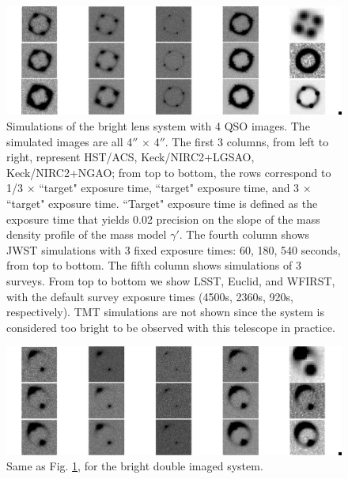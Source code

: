 \documentclass[a4paper,11pt]{article}
\begin{document}
\begin{figure}
\begin{center}
\includegraphics[width=1.0\textwidth]{figures/brighter_system_4QSOimages_all.png}
\end{center}
\caption{Simulations of the bright lens system with 4 QSO images. The simulated images are all 4$''$ $\times$ 4$''$. The first 3 columns, from left to right, represent HST/ACS, Keck/NIRC2+LGSAO, Keck/NIRC2+NGAO; from top to bottom, the rows correspond to 1/3 $\times$ ``target" exposure time, ``target" exposure time, and 3 $\times$ ``target" exposure time. ``Target" exposure time is defined as the exposure time that yields 0.02 precision on the slope of the mass density profile of the mass model $\gamma'$. The fourth column shows JWST simulations with 3 fixed exposure times: 60, 180, 540 seconds, from top to bottom. The fifth column
shows simulations of 3 surveys. From top to bottom we show LSST,
Euclid, and WFIRST, with the default survey exposure times (4500s,
2360s, 920s, respectively). TMT simulations are not shown since the
system is considered too bright to be observed with this telescope in
practice.}
\label{fig:brighter_4QSOimages_montage}
\end{figure}


\begin{figure}
\begin{center}
\includegraphics[width=1.0\textwidth]{figures/brighter_system_2QSOimages_all.png}
\end{center}
\caption{Same as Fig. \ref{fig:brighter_4QSOimages_montage}, for the bright double imaged system.}
\label{fig:brighter_2QSOimages_montage}
\end{figure}
\end{document}
